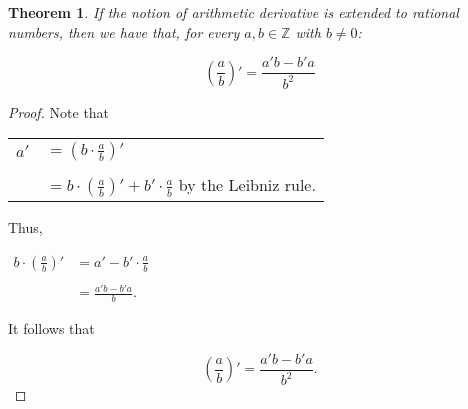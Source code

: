\documentclass[12pt]{article}
\newtheorem*{thm}{Theorem}
\begin{document}
\begin{thm}
If the notion of arithmetic derivative is extended to rational numbers, then we have that, for every $a,b \in \mathbb{Z}$ with $b \neq 0$:

$$\left(\frac{a}{b}\right)'=\frac{a'b-b'a}{b^2}$$
\end{thm}

\begin{proof}

Note that

\begin{center}
\begin{tabular}{rl}
$a'$ & $= \displaystyle \left( b \cdot \frac{a}{b} \right)'$ \\
& \\
& $= \displaystyle b \cdot \left( \frac{a}{b} \right)' +b' \cdot \frac{a}{b}$ by the Leibniz rule.
\end{tabular}
\end{center}

Thus,

\begin{center}
$\begin{array}{rl}
\displaystyle b \cdot \left( \frac{a}{b} \right)' & = \displaystyle a'-b' \cdot \frac{a}{b} \\
& \\
& = \displaystyle \frac{a'b-b'a}{b}. \end{array}$
\end{center}

It follows that

$$\left(\frac{a}{b}\right)'=\frac{a'b-b'a}{b^2}.$$
\end{proof}
\end{document}
